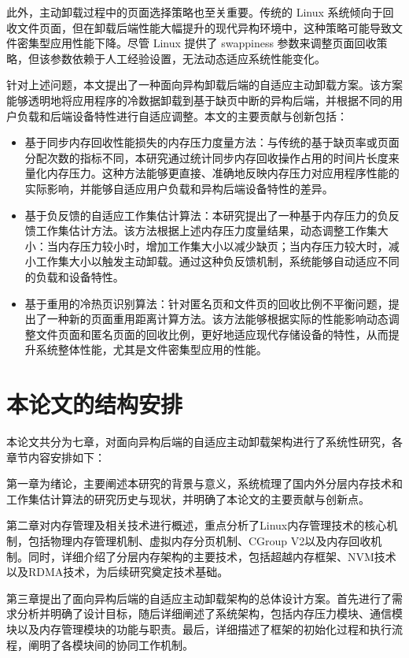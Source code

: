 此外，主动卸载过程中的页面选择策略也至关重要。传统的 Linux 系统倾向于回收文件页面，但在卸载后端性能大幅提升的现代异构环境中，这种策略可能导致文件密集型应用性能下降。尽管 Linux 提供了 swappiness 参数来调整页面回收策略，但该参数依赖于人工经验设置，无法动态适应系统性能变化。

针对上述问题，本文提出了一种面向异构卸载后端的自适应主动卸载方案。该方案能够透明地将应用程序的冷数据卸载到基于缺页中断的异构后端，并根据不同的用户负载和后端设备特性进行自适应调整。本文的主要贡献与创新包括：

\begin{itemize}
    \item 基于同步内存回收性能损失的内存压力度量方法：与传统的基于缺页率或页面分配次数的指标不同，本研究通过统计同步内存回收操作占用的时间片长度来量化内存压力。这种方法能够更直接、准确地反映内存压力对应用程序性能的实际影响，并能够自适应用户负载和异构后端设备特性的差异。

    \item 基于负反馈的自适应工作集估计算法：本研究提出了一种基于内存压力的负反馈工作集估计方法。该方法根据上述内存压力度量结果，动态调整工作集大小：当内存压力较小时，增加工作集大小以减少缺页；当内存压力较大时，减小工作集大小以触发主动卸载。通过这种负反馈机制，系统能够自动适应不同的负载和设备特性。

    \item 基于重用的冷热页识别算法：针对匿名页和文件页的回收比例不平衡问题，提出了一种新的页面重用距离计算方法。该方法能够根据实际的性能影响动态调整文件页面和匿名页面的回收比例，更好地适应现代存储设备的特性，从而提升系统整体性能，尤其是文件密集型应用的性能。
\end{itemize}

\section{本论文的结构安排}

本论文共分为七章，对面向异构后端的自适应主动卸载架构进行了系统性研究，各章节内容安排如下：

第一章为绪论，主要阐述本研究的背景与意义，系统梳理了国内外分层内存技术和工作集估计算法的研究历史与现状，并明确了本论文的主要贡献与创新点。

第二章对内存管理及相关技术进行概述，重点分析了Linux内存管理技术的核心机制，包括物理内存管理机制、虚拟内存分页机制、CGroup V2以及内存回收机制。同时，详细介绍了分层内存架构的主要技术，包括超越内存框架、NVM技术以及RDMA技术，为后续研究奠定技术基础。

第三章提出了面向异构后端的自适应主动卸载架构的总体设计方案。首先进行了需求分析并明确了设计目标，随后详细阐述了系统架构，包括内存压力模块、通信模块以及内存管理模块的功能与职责。最后，详细描述了框架的初始化过程和执行流程，阐明了各模块间的协同工作机制。

